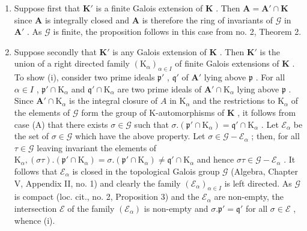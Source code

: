 \begin{enumerate}
\def\labelenumi{(\Alph{enumi})}
\item
  Suppose first that \(\mathbf{K}'\) is a finite Galois extension of \(\mathbf{K}\) . Then \(\mathbf{A} = \mathbf{A}' \cap \mathbf{K}\) since \(\mathbf{A}\) is integrally closed and \(\mathbf{A}\) is therefore the ring of invariants of \(\mathcal{G}\) in \(\mathbf{A}'\) . As \(\mathcal{G}\) is finite, the proposition follows in this case from no. 2, Theorem 2.
\item
  Suppose secondly that \(\mathbf{K}'\) is any Galois extension of \(\mathbf{K}\) . Then \(\mathbf{K}'\) is the union of a right directed family \((\mathrm{K}_{\alpha})_{\alpha \in I}\) of finite Galois extensions of \(\mathbf{K}\) . To show (i), consider two prime ideals \(\mathfrak{p}'\) , \(\mathfrak{q}'\) of \(\mathbf{A}'\) lying above \(\mathfrak{p}\) . For all \(\alpha \in I\) , \(\mathfrak{p}' \cap \mathrm{K}_{\alpha}\) and \(\mathfrak{q}' \cap \mathrm{K}_{\alpha}\) are two prime ideals of \(\mathbf{A}' \cap \mathrm{K}_{\alpha}\) lying above \(\mathfrak{p}\) . Since \(\mathbf{A}' \cap \mathrm{K}_{\alpha}\) is the integral closure of \(A\) in \(\mathrm{K}_{\alpha}\) and the restrictions to \(\mathrm{K}_{\alpha}\) of the elements of \(\mathcal{G}\) form the group of K-automorphisms of \(\mathbf{K}\) , it follows from case (A) that there exists \(\sigma \in \mathcal{G}\) such that \(\sigma. (\mathfrak{p}' \cap \mathrm{K}_{\alpha}) = \mathfrak{q}' \cap \mathrm{K}_{\alpha}\) . Let \(\mathcal{E}_{\alpha}\) be the set of \(\sigma \in \mathcal{G}\) which have the above property. Let \(\sigma \in \mathcal{G} - \mathcal{E}_{\alpha}\) ; then, for all \(\tau \in \mathcal{G}\) leaving invariant the elements of \(\mathrm{K}_{\alpha}, (\sigma \tau). (\mathfrak{p}' \cap \mathrm{K}_{\alpha}) = \sigma. (\mathfrak{p}' \cap \mathrm{K}_{\alpha}) \neq \mathfrak{q}' \cap \mathrm{K}_{\alpha}\) and hence \(\sigma \tau \in \mathcal{G} - \mathcal{E}_{\alpha}\) . It follows that \(\mathcal{E}_{\alpha}\) is closed in the topological Galois group \(\mathcal{G}\) (Algebra, Chapter V, Appendix II, no. 1) and clearly the family \((\mathcal{E}_{\alpha})_{\alpha \in I}\) is left directed. As \(\mathcal{G}\) is compact (loc. cit., no. 2, Proposition 3) and the \(\mathcal{E}_{\alpha}\) are non-empty, the intersection \(\mathcal{E}\) of the family \((\mathcal{E}_{\alpha})\) is non-empty and \(\sigma. \mathfrak{p}' = \mathfrak{q}'\) for all \(\sigma \in \mathcal{E}\) , whence (i).
\end{enumerate}

